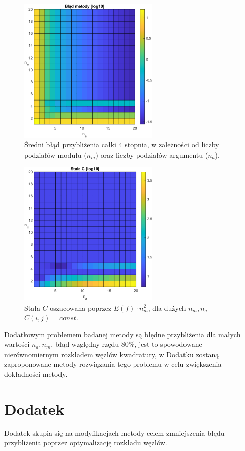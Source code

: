 \documentclass[a4paper,12pt]{article}
\begin{document}
\begin{figure}[h]
    \centering
    \includegraphics[height=7cm]{error.png}
    \caption{Średni błąd przybliżenia całki 4 stopnia, w zależności od liczby podziałów modułu ($n_m$) oraz liczby podziałów argumentu ($n_a$).}
\end{figure}

\begin{figure}[h]
    \centering
    \includegraphics[height=7cm]{stalaC.png}
    \caption{Stała $C$ oszacowana poprzez $E(f)\cdot n_m^2$, dla dużych $n_m, n_a$ $C(i,j)=const$.}
\end{figure}

    Dodatkowym problemem badanej metody są błędne przybliżenia dla małych wartości $n_a, n_m$, błąd względny rzędu $80\%$, jest to spowodowane nierównomiernym rozkładem węzłów kwadratury, w Dodatku zostaną zaproponowane metody rozwiązania tego problemu w celu zwiększenia dokładności metody.

\break

\section*{Dodatek}
    Dodatek skupia się na modyfikacjach metody celem zmniejszenia błędu przybliżenia poprzez optymalizację rozkładu węzłów. 
        
\end{document}
